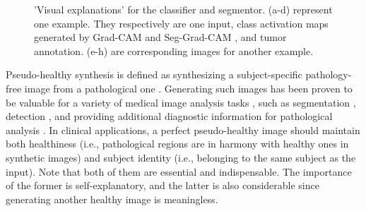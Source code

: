 \documentclass[journal,twoside,web]{ieeecolor}
\begin{document}
\begin{figure}
	\caption{'Visual explanations' for the classifier and segmentor. (a-d) represent one example. They respectively are one input, class activation maps generated by Grad-CAM \cite{selvaraju2017grad} and Seg-Grad-CAM \cite{vinogradova2020towards}, and tumor annotation. (e-h) are corresponding images for another example.
	}\label{fig1}
\end{figure}

Pseudo-healthy synthesis is defined as synthesizing a subject-specific pathology-free image from a pathological one \cite{bowles2016pseudo,xia2020pseudo}. Generating such images has been proven to be valuable for a variety of medical image analysis tasks \cite{xia2020pseudo}, such as segmentation \cite{bowles2017brain,ye2013modality,sun2020adversarial,andermatt2018pathology,bowles2016pseudo}, detection \cite{tsunoda2014pseudo}, and providing additional diagnostic information for pathological analysis \cite{baumgartner2018visual,sun2020adversarial}. In clinical applications, a perfect pseudo-healthy image should maintain both healthiness (i.e., pathological regions are in harmony with healthy ones in synthetic images) and subject identity (i.e., belonging to the same subject as the input). Note that both of them are essential and indispensable. The importance of the former is self-explanatory, and the latter is also considerable since generating another healthy image is meaningless.
\end{document}
